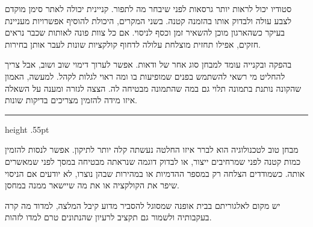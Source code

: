 
\vspace{9mm}

{\fontsize{17.3}{26.2}\selectfont
סטודיו יכול לראות יותר גרסאות לפני שיבחר מה לתפור. קניינית יכולה לאתר סימן מוקדם לצבע עולה ולבדוק אותו בהזמנה קטנה. בשני המקרים, היכולת להוסיף אפשרויות מעניינת בעיקר כשהארגון מוכן להשאיר זמן וכסף לניסוי. אם כל צוות פונה לאותות שכבר נראים חזקים, אפילו תחזית מוצלחת עלולה לדחוף קולקציות שונות לעבר אותן בחירות.

בהפקה ובקנייה עומד למבחן סוג אחר של ודאות. אפשר לערוך דימוי שוב ושוב, אבל צריך להחליט מי רשאי להשתמש בפנים שמופיעות בו ומה ראוי לגלות לקהל. למעשה, האמון שהקונה נותנת בתמונה תלוי גם במה שהתמונה מבטיחה לה. הצצה לגזרה ומענה על השאלה איזו מידה להזמין מצריכים בדיקות שונות.

\par}

\vspace{5mm}
{\color{Silver}\hrule height .55pt}
\vspace{5mm}

{\fontsize{17.3}{26.2}\selectfont
מבחן טוב לטכנולוגיה הוא לברר איזו החלטה נעשתה קלה יותר לתיקון. אפשר לנסות להזמין כמות קטנה לפני שמרחיבים ייצור, או לבדוק דוגמה שנראתה מבטיחה במסך לפני שמאשרים אותה. כשמודדים הצלחה רק במספר ההדמיות או במהירות שבהן נוצרו, לא יודעים אם הניסוי שיפר את הקולקציה או את מה שיישאר ממנה במחסן.

יש מקום לאלגוריתם בבית אופנה שמסוגל להסביר מדוע קיבל המלצה, למדוד מה קרה בעקבותיה ולשמור גם תקציב לרעיון שהנתונים טרם למדו לזהות.
\par}
